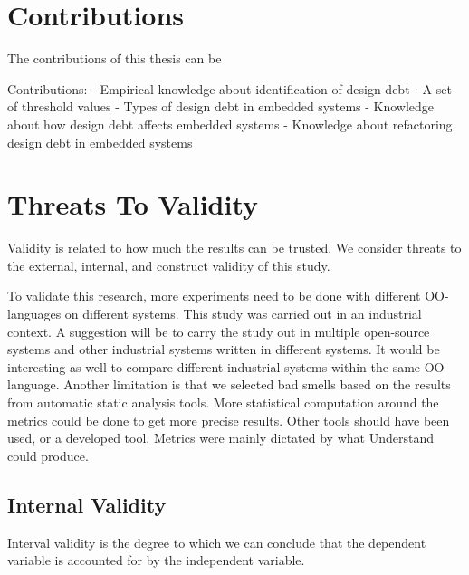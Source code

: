 \section{Contributions}
The contributions of this thesis can be


Contributions:
- Empirical knowledge about identification of design debt
	- A set of threshold values
- Types of design debt in embedded systems
- Knowledge about how design debt affects embedded systems
- Knowledge about refactoring design debt in embedded systems









\section{Threats To Validity}
\label{sub:threats_to_validity}
Validity is related to how much the results can be trusted\cite{Wohlin:2000:ESE:330775}. We consider threats to the external, internal, and construct validity of this study.

To validate this research, more experiments need to be done with different OO-languages on different systems. This study was carried out in an industrial context. A suggestion will be to carry the study out in multiple open-source systems and other industrial systems written in different systems. It would be interesting as well to compare different industrial systems within the same OO-language. Another limitation is that we selected bad smells based on the results from automatic static analysis tools. More statistical computation around the metrics could be done to get more precise results. Other tools should have been used, or a developed tool. Metrics were mainly dictated by what Understand could produce. 

\subsection{Internal Validity}
\label{sub:internal_validty}
Interval validity is the degree to which we can conclude that the dependent variable is accounted for by the independent variable.



